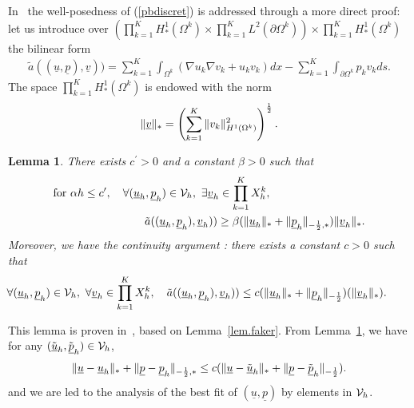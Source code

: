 \documentclass[final]{siamltex}
\newtheorem{lem}{Lemma}
\begin{document}
In~\cite{JMN10} the well-posedness of (\ref{pbdiscret}) is addressed through a  more direct
proof: let us introduce over
$(\prod_{k=1}^K H^1_*(\Omega^k)\times \prod_{k=1}^K
L^2(\partial\Omega^k))\times \prod_{k=1}^K H^1_*(\Omega^k)$ the
bilinear form
\begin{eqnarray*}
\label{fbs_discret}
\tilde a(({{\underline u}},{{\underline p}}), {{\underline v}})) = \sum_{k=1}^K
\int_{\Omega^k} \left( \nabla u_k\nabla v_k
+u_k v_k \right) dx -\sum_{k=1}^K
  \int_{\partial\Omega^k}p_k v_k ds.
\end{eqnarray*}
The space $\prod_{k=1}^K H^1_*(\Omega^k)$ is endowed with the norm
\begin{eqnarray}
\|{{\underline v}}\|_* = \left(\sum_{k=1}^K \|v_k\|_{H^1(\Omega^k)}^2 \right)^{1 \over
2}.
\nonumber
\end{eqnarray}
\vspace{1mm}
\begin{lem}\label{lem.infsup}
There exists $c^\prime>0$ and a constant $\beta>0$ such that
\vspace{-3mm}
\begin{eqnarray*}
\label{inf-sup_discret}
\mbox{for } \alpha h\le c^\prime, \quad \forall ({{\underline u}}_h,{{\underline p}}_h) \in {\cal V}_h ,\ \exists {{\underline v}}_h\in\prod_{k=1}^K
X_h^k, \hspace{3cm}\nonumber\\
\tilde a(({{\underline u}}_h,{{\underline p}}_h), {{\underline v}}_h)) \ge
\beta (\|{{\underline u}}_h\|_*+ \|{{\underline p}}_h\|_{-{1\over 2},*}) \|{{\underline v}}_h\|_*.
\end{eqnarray*}
Moreover, we have the continuity argument : there exists a constant
$c>0$ such that
\begin{eqnarray}\label{ineq:continuity}
\hspace{-8mm}\forall ({{\underline u}}_h,{{\underline p}}_h) \in {\cal V}_h ,\ \forall {{\underline v}}_h\in\prod_{k=1}^K
X_h^k, \quad
\tilde a(({{\underline u}}_h,{{\underline p}}_h), {{\underline v}}_h)) \le c (\| {{\underline u}}_h \|_* +
\|{{\underline p}}_h\|_{-{1 \over 2}}) (\| {{\underline v}}_h \|_*).
\end{eqnarray}
\end{lem}
This lemma is proven in~\cite{JMN10}, based on Lemma~\ref{lem.faker}.
From Lemma~\ref{lem.infsup}, we have
for any $(\tilde{{\underline u}}_h,\tilde {{\underline p}}_h)\in{\cal V}_h$,
\begin{eqnarray}\label{estimuuh}
\| {{\underline u}} - {{\underline u}}_h\|_* +  \|{{\underline p}} - {{\underline p}}_h\|_{-{1 \over 2},*}  \le
c (\| {{\underline u}} - \tilde{{\underline u}}_h\|_* +  \|{{\underline p}} - \tilde{{\underline p}}_h\|_{-{1 \over 2}}).
\end{eqnarray}
and we are led to the analysis of the best fit of $({{\underline u}},{{\underline p}})$
by elements in ${\cal V}_h$.
\end{document}
